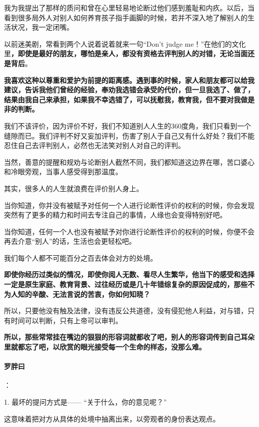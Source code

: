 \documentclass[UTF8,a4paper,8pt]{ctexbook}
\begin{document}
		我为我提出了那样的质问和曾在心里轻易地论断过他们感到羞耻和内疚。以后，当看到很多局外人对别人如何养育孩子指手画脚的时候，若并不深入地了解别人的生活状况，我一定闭嘴。
		
		以前迷美剧，常看到两个人说着说着就来一句“Don’t judge me！”在他们的文化里\textbf{，即使是最好的朋友，哪怕是亲人，都没有资格去评判别人的对错，无论当面还是背后}。
		
		\textbf{我喜欢这种以尊重和爱护为前提的距离感。遇到事的时候，家人和朋友都可以给我建议，告诉我他们曾经的经验，奉劝我选错会承受的代价，但一旦我选了、做了，结果由我自己来承担，如果我不幸选错了，可以抚慰我，教育我，但不要对我做是非的判断。}
		
		我们不该评价，因为评价不好，我们不知道别人人生的360度角，我们只看到一个缝隙而已。我们评判不好又妄加评判，伤害了别人于自己又有什么好处？我们不能忍住自己去评判别人，必然也无法笑对别人对自己的评判。
		
		当然，善意的提醒和规劝与论断别人截然不同，我们都知道这边界在哪，苦口婆心和冷眼旁观，当事人感受得到那温度。
		
		其实，很多人的人生就浪费在评价别人身上。
		
		当你知道，你并没有被赋予对任何一个人进行论断性评价的权利的时候，你会发现突然有了更多的精力和时间去专注自己的事情，人缘也会变得特别好吧。
		
		当你知道，任何一个人也没有被赋予对你进行论断性评价的权利的时候，你便不会再去介意“别人”的话，生活也会更轻松吧。
		
		我们每个人都不可能百分之百去体会对方的处境。
		
		\textbf{即使你经历过类似的情况，即使你阅人无数、看尽人生繁华，他当下的感受和选择一定是原生家庭、教育背景、过往经历或是几十年错综复杂的原因促成的，那些不为人知的辛酸、无法言说的苦衷，你如何知晓？}
		
		所以，只要他没有触及法律，没有违反公共道德，没有侵犯他人利益，对与错，只有时间可以判断，只有上帝可以审判。
		
		\textbf{所以，那些常常挂在嘴边的狠狠的形容词就都收了吧，别人的形容词传到自己耳朵里就都忘了吧，以欣赏的眼光接受每一个生命的样态，没那么难。}
		
		
		\paragraph{罗胖曰}：
		
		1. 最坏的提问方式是——
		“关于什么，你的意见呢？”
		
		这意味着把对方从具体的处境中抽离出来，以旁观者的身份表达观点。
		
\end{document}
